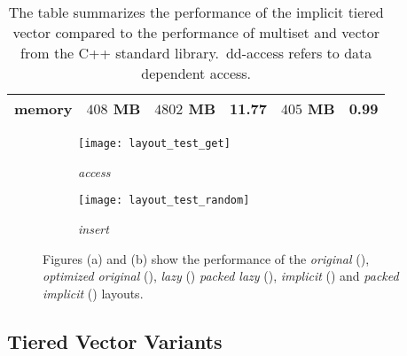 \begin{table}
\begin{tabular}{|l|r|r|r|r|r|}
		memory     & $408$ MB                               & $4802$ MB                     & 11.77                                       & $405$ MB                    & 0.99                                      \\ \hline
	\end{tabular}
	\caption{The table summarizes the performance of the implicit tiered vector
		compared to the performance of multiset and vector from the C++ standard library.\
		dd-access refers to data dependent access.}
\label{tab:test_comp}
\end{table}


\newcommand{\purple}{\raisebox{2pt}{\tikz{\draw[cpurple,solid,line width=1.9pt](0,0) -- (3mm,0);}}}
\newcommand{\green}{\raisebox{2pt}{\tikz{\draw[cgreen,solid,line width=1.9pt](0,0) -- (3mm,0);}}}
\newcommand{\blue}{\raisebox{2pt}{\tikz{\draw[cblue,solid,line width=1.9pt](0,0) -- (3mm,0);}}}
\newcommand{\dblue}{\raisebox{2pt}{\tikz{\draw[cdblue,solid,line width=1.9pt](0,0) -- (3mm,0);}}}
\newcommand{\orange}{\raisebox{2pt}{\tikz{\draw[corange,solid,line width=1.9pt](0,0) -- (3mm,0);}}}
\newcommand{\yellow}{\raisebox{2pt}{\tikz{\draw[cyellow,solid,line width=1.9pt](0,0) -- (3mm,0);}}}
\newcommand{\red}{\raisebox{2pt}{\tikz{\draw[cred,solid,line width=1.9pt](0,0) -- (3mm,0);}}}


\begin{figure}[ht]
	\centering
	\begin{subfigure}[b]{0.3\textwidth}
		\texttt{[image: layout\_test\_get]}
		\caption{\textit{access}}
	\end{subfigure}
	\begin{subfigure}[b]{0.3\textwidth}
		\texttt{[image: layout\_test\_random]}
		\caption{\textit{insert}}
	\end{subfigure}
        \caption{Figures (a) and (b) show the performance of the
            \textit{original} (\protect\purple), \textit{optimized original}
            (\protect\green), \textit{lazy} (\protect\blue) \textit{packed
            lazy} (\protect\orange),
            \textit{implicit} (\protect\yellow)
            and \textit{packed implicit} (\protect\dblue) layouts.}
\label{fig:test_representation}
\end{figure}
\subsection{Tiered Vector Variants}

